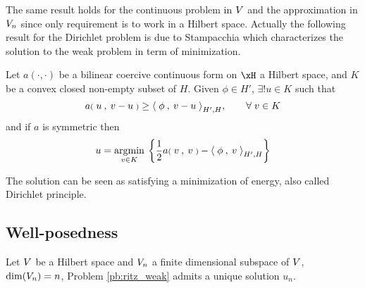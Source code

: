 \medskip
The same result holds for the continuous problem in ${V}$ and the approximation in ${V}_n$ since only requirement is to work in a Hilbert space.
Actually the following result for the Dirichlet problem is due to Stampacchia which characterizes the solution to the weak problem in term of minimization.
\begin{thrm}[Stampacchia] Let $a(\cdot, \cdot)$ be a bilinear coercive continuous form on $\xH$ a Hilbert space, and $K$ be a convex closed non-empty subset of $H$.
Given $\phi\in H'$, $\exists ! u \in K$ such that
\begin{equation*}
a{{\scriptstyle\mathbf{(}}\;u\:,\: v -u \;{\scriptstyle\mathbf{)}}} \geq \mathbf{\langle}\;\phi\:,\: v - u \;\mathbf{\rangle}_{H', H},\qquad {\forall\;} v \in K
\end{equation*}
and if $a$ is symmetric then
\begin{equation*}
u = \mathop{\underset{v\in K}{\mathrm{argmin}}}\: \left\lbrace \frac{1}{2} a{{\scriptstyle\mathbf{(}}\;v\:,\: v \;{\scriptstyle\mathbf{)}}} - \mathbf{\langle}\;\phi\:,\: v \;\mathbf{\rangle}_{H', H} \right\rbrace
\end{equation*}
\end{thrm}
The solution can be seen as satisfying a minimization of energy, also called Dirichlet principle.

\subsection{Well-posedness}

\medskip
\begin{thrm}
Let ${V}$ be a Hilbert space and ${V}_n$ a finite dimensional subspace of ${V}$, $\dim({V}_n) = n$, Problem \eqref{pb:ritz_weak} admits a unique solution $u_n$.
\end{thrm}

